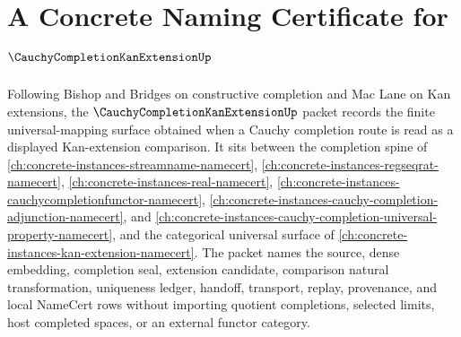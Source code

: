 \chapter{A Concrete Naming Certificate for $\CauchyCompletionKanExtensionUp$}
\label{ch:concrete-instances-cauchy-completion-kan-extension-namecert}

Following Bishop and Bridges on constructive completion and Mac Lane on Kan extensions, the $\CauchyCompletionKanExtensionUp$ packet records the finite universal-mapping surface obtained when a Cauchy completion route is read as a displayed Kan-extension comparison. It sits between the completion spine of \autoref{ch:concrete-instances-streamname-namecert}, \autoref{ch:concrete-instances-regseqrat-namecert}, \autoref{ch:concrete-instances-real-namecert}, \autoref{ch:concrete-instances-cauchycompletionfunctor-namecert}, \autoref{ch:concrete-instances-cauchy-completion-adjunction-namecert}, and \autoref{ch:concrete-instances-cauchy-completion-universal-property-namecert}, and the categorical universal surface of \autoref{ch:concrete-instances-kan-extension-namecert}. The packet names the source, dense embedding, completion seal, extension candidate, comparison natural transformation, uniqueness ledger, handoff, transport, replay, provenance, and local NameCert rows without importing quotient completions, selected limits, host completed spaces, or an external functor category.

